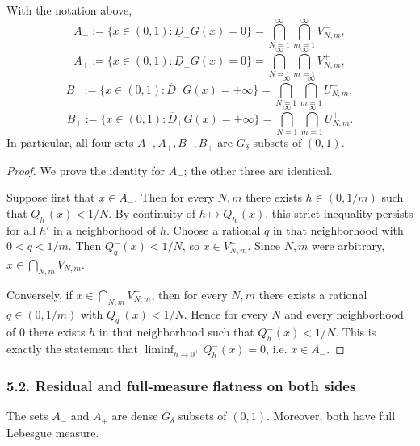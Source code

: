 \begin{lemma}\label{lem:Gdelta-onesided}
With the notation above,
\[
A_-:=\{x\in(0,1):\underline D_-G(x)=0\}=\bigcap_{N=1}^\infty\bigcap_{m=1}^\infty V^-_{N,m},
\]
\[
A_+:=\{x\in(0,1):\underline D_+G(x)=0\}=\bigcap_{N=1}^\infty\bigcap_{m=1}^\infty V^+_{N,m},
\]
\[
B_-:=\{x\in(0,1):\overline D_-G(x)=+\infty\}=\bigcap_{N=1}^\infty\bigcap_{m=1}^\infty U^-_{N,m},
\]
\[
B_+:=\{x\in(0,1):\overline D_+G(x)=+\infty\}=\bigcap_{N=1}^\infty\bigcap_{m=1}^\infty U^+_{N,m}.
\]
In particular, all four sets $A_-,A_+,B_-,B_+$ are $G_\delta$ subsets of $(0,1)$.
\end{lemma}

\begin{proof}
We prove the identity for $A_-$; the other three are identical.

Suppose first that $x\in A_-$. Then for every $N,m$ there exists $h\in(0,1/m)$ such that $Q_h^-(x)<1/N$.
By continuity of $h\mapsto Q_h^-(x)$, this strict inequality persists for all $h'$ in a neighborhood of $h$.
Choose a rational $q$ in that neighborhood with $0<q<1/m$. Then $Q_q^-(x)<1/N$, so $x\in V^-_{N,m}$.
Since $N,m$ were arbitrary, $x\in\bigcap_{N,m}V^-_{N,m}$.

Conversely, if $x\in\bigcap_{N,m}V^-_{N,m}$, then for every $N,m$ there exists a rational $q\in(0,1/m)$ with
$Q_q^-(x)<1/N$. Hence for every $N$ and every neighborhood of $0$ there exists $h$ in that neighborhood such that
$Q_h^-(x)<1/N$. This is exactly the statement that $\liminf_{h\to0^+}Q_h^-(x)=0$, i.e. $x\in A_-$.
\end{proof}

\subsubsection*{5.2. Residual and full-measure flatness on both sides}

\begin{theorem}\label{thm:lowers-zero}
The sets $A_-$ and $A_+$ are dense $G_\delta$ subsets of $(0,1)$.
Moreover, both have full Lebesgue measure.
\end{theorem}

